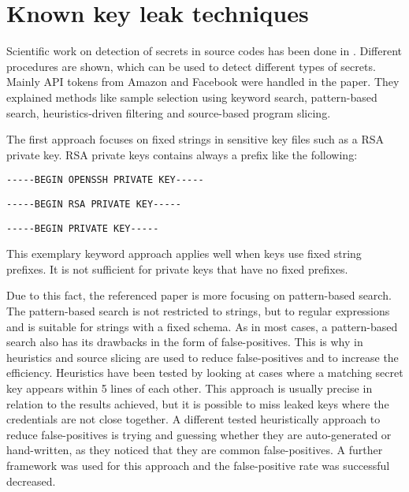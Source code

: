 %
%

\chapter{Known key leak techniques}
\label{ch:known_key_leak_techniques}
Scientific work on detection of secrets in source codes has been done in \cite{7180102}. Different procedures are shown, which can be used to detect different types of secrets. Mainly API tokens from Amazon and Facebook were handled in the paper. They explained methods like sample selection using keyword search, pattern-based search, heuristics-driven filtering and source-based program slicing. 

The first approach focuses on fixed strings in sensitive key files such as a RSA private key. RSA private keys contains always a prefix like the following:
\begin{lstlisting}
-----BEGIN OPENSSH PRIVATE KEY-----
\end{lstlisting}
\begin{lstlisting}
-----BEGIN RSA PRIVATE KEY-----
\end{lstlisting}
\begin{lstlisting}
-----BEGIN PRIVATE KEY-----
\end{lstlisting}


This exemplary keyword approach applies well when keys use fixed string prefixes. It is not sufficient for private keys that have no fixed prefixes.

Due to this fact, the referenced paper is more focusing on pattern-based search. The pattern-based search is not restricted to strings, but to regular expressions and is suitable for strings with a fixed schema.
As in most cases, a pattern-based search also has its drawbacks in the form of false-positives. This is why in \cite{7180102} heuristics and source slicing are used to reduce false-positives and to increase the efficiency.
Heuristics have been tested by looking at cases where a matching secret key appears within 5 lines of each other. This approach is usually precise in relation to the results achieved, but it is possible to miss leaked keys where the credentials are not close together. A different tested heuristically approach to reduce false-positives is trying and guessing whether they are auto-generated or hand-written, as they noticed that they are common false-positives.
A further framework was used for this approach and the false-positive rate was successful decreased.

